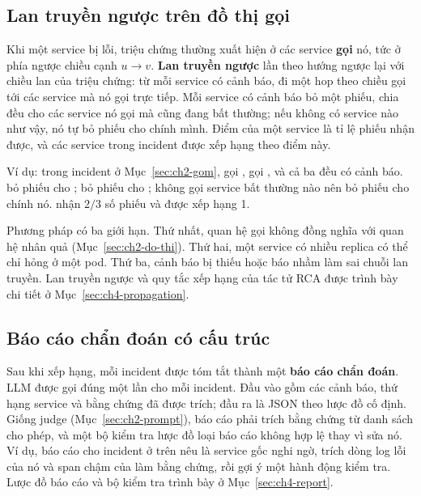 \subsection{Lan truyền ngược trên đồ thị gọi}
\label{sec:ch2-lan-truyen}

Khi một service bị lỗi, triệu chứng thường xuất hiện ở các service \textbf{gọi} nó, tức ở phía ngược chiều cạnh $u \to v$. \textbf{Lan truyền ngược} lần theo hướng ngược lại với chiều lan của triệu chứng: từ mỗi service có cảnh báo, đi một hop theo chiều gọi tới các service mà nó gọi trực tiếp. Mỗi service có cảnh báo bỏ một phiếu, chia đều cho các service nó gọi mà cũng đang bất thường; nếu không có service nào như vậy, nó tự bỏ phiếu cho chính mình. Điểm của một service là tỉ lệ phiếu nhận được, và các service trong incident được xếp hạng theo điểm này.

Ví dụ: trong incident ở Mục~\ref{sec:ch2-gom},  gọi ,  gọi , và cả ba đều có cảnh báo.  bỏ phiếu cho ;  bỏ phiếu cho ;  không gọi service bất thường nào nên bỏ phiếu cho chính nó.  nhận $2/3$ số phiếu và được xếp hạng 1.

Phương pháp có ba giới hạn. Thứ nhất, quan hệ gọi không đồng nghĩa với quan hệ nhân quả (Mục~\ref{sec:ch2-do-thi}). Thứ hai, một service có nhiều replica có thể chỉ hỏng ở một pod. Thứ ba, cảnh báo bị thiếu hoặc báo nhầm làm sai chuỗi lan truyền. Lan truyền ngược và quy tắc xếp hạng của tác tử RCA được trình bày chi tiết ở Mục~\ref{sec:ch4-propagation}.

\subsection{Báo cáo chẩn đoán có cấu trúc}
\label{sec:ch2-bao-cao}

Sau khi xếp hạng, mỗi incident được tóm tắt thành một \textbf{báo cáo chẩn đoán}. LLM được gọi đúng một lần cho mỗi incident. Đầu vào gồm các cảnh báo, thứ hạng service và bằng chứng đã được trích; đầu ra là JSON theo lược đồ cố định. Giống judge (Mục~\ref{sec:ch2-prompt}), báo cáo phải trích bằng chứng từ danh sách cho phép, và một bộ kiểm tra lược đồ loại báo cáo không hợp lệ thay vì sửa nó. Ví dụ, báo cáo cho incident ở trên nêu  là service gốc nghi ngờ, trích dòng log lỗi của nó và span chậm của  làm bằng chứng, rồi gợi ý một hành động kiểm tra. Lược đồ báo cáo và bộ kiểm tra trình bày ở Mục~\ref{sec:ch4-report}.

